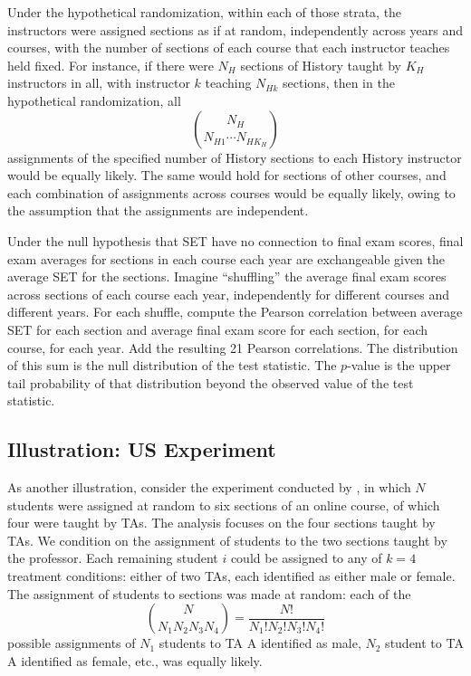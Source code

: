 \documentclass[12pt]{article}
\newcommand{\beq}{\begin{equation}}
\newcommand{\eeq}{\end{equation}}
\newcommand{\todo}[1]{{\color{red}{TO DO: \sc #1}}}
\begin{document}
Under the hypothetical randomization, within each of those strata, the instructors
were assigned sections as if at random, independently across years and courses, with
the number of sections of each course that each instructor teaches held fixed.
For instance, if there were $N_H$ sections of History taught by $K_H$ instructors in all,
with instructor $k$ teaching $N_{Hk}$ sections, then in the hypothetical randomization,
all
\beq
    {N_H}\choose{N_{H1} \cdots N_{HK_H}}
\eeq
assignments of the specified number of History sections to each History instructor 
would be equally likely.
The same would hold for sections of other courses,
and each combination of assignments across courses would be equally likely,
owing to the assumption that the assignments are independent.

Under the null hypothesis that SET have no connection to final exam scores,
final exam averages for sections in each course each year are exchangeable given the average SET
for the sections.
Imagine ``shuffling'' the average final exam scores across sections of each course
each year, independently
for different courses and different years.
For each shuffle, compute the Pearson correlation between average SET for each section
and average final exam score for each section, for each course, for each year.
Add the resulting 21 Pearson correlations.
The distribution of this sum is the null distribution of the test statistic.
The $p$-value is the upper tail probability of that distribution beyond the observed value of the 
test statistic.
\todo{more here}

\subsection{Illustration: US Experiment}
As another illustration, consider the experiment conducted by \citet{MacNell2014},
in which $N$ students were assigned at random to six sections of an online course,
of which four were taught by TAs.
The analysis focuses on the four sections taught by TAs.
We condition on the assignment of students to the two sections taught by the professor.
Each remaining student $i$ could be assigned to any of $k=4$ treatment conditions:
either of two TAs, each identified as either male or female.
The assignment of students to sections was made at random: each of the
\beq
 {{N}\choose{N_1 N_2 N_3 N_4}} = \frac{N!}{N_1! N_2! N_3! N_4!}
\eeq
possible assignments of $N_1$ students to TA A identified as male,
$N_2$ student to TA A identified as female, etc., was equally likely.
\end{document}
